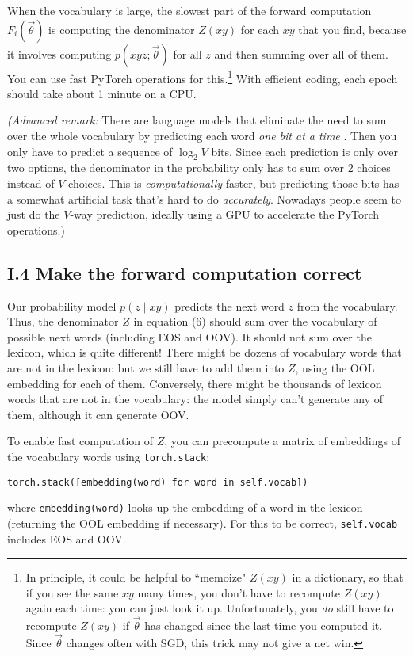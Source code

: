 When the vocabulary is large, the slowest part of the forward computation $F_i(\vec{\theta})$ is computing the denominator $Z(xy)$ for each $xy$ that you find, because it involves computing $\tilde{p}(xyz;\vec{\theta})$ for all $z$ and then summing over all of them. You can use fast PyTorch operations for this.\footnote{In principle, it could be helpful to ``memoize" $Z(xy)$ in a dictionary, so that if you see the same $xy$ many times, you don’t have to recompute $Z(xy)$ again each time: you can just look it up. Unfortunately, you \emph{do} still have to recompute $Z(xy)$ if $\vec{\theta}$ has changed since the last time you computed it. Since $\vec{\theta}$ changes often with SGD, this trick may not give a net win.} With efficient coding, each epoch should take about 1 minute on a CPU.

\textit{(Advanced remark:} There are language models that eliminate the need to sum over the whole vocabulary by predicting each word \textit{one bit at a time} \citep{MnihHinton2009}. Then you only have to predict a sequence of $\log_2 V$ bits. Since each prediction is only over two options, the denominator in the probability only has to sum over 2 choices instead of $V$ choices. This is \textit{computationally} faster, but predicting those bits has a somewhat artificial task that’s hard to do \textit{accurately}. Nowadays people seem to just do the $V$-way prediction, ideally using a GPU to accelerate the PyTorch operations.) 

\subsection*{I.4 Make the forward computation correct}

Our probability model $p(z \mid xy)$ predicts the next word $z$ from the vocabulary. Thus, the denominator $Z$ in equation (6) should sum over the vocabulary of possible next words (including EOS and OOV). It should not sum over the lexicon, which is quite different! There might be dozens of vocabulary words that are not in the lexicon: but we still have to add them into $Z$, using the OOL embedding for each of them. Conversely, there might be thousands of lexicon words that are not in the vocabulary: the model simply can’t generate any of them, although it can generate OOV.

To enable fast computation of $Z$, you can precompute a matrix of embeddings of the vocabulary words using \texttt{torch.stack}:
\begin{verbatim}
torch.stack([embedding(word) for word in self.vocab])
\end{verbatim}
where \texttt{embedding(word)} looks up the embedding of a word in the lexicon (returning the OOL embedding if necessary). For this to be correct, \texttt{self.vocab} includes EOS and OOV.

